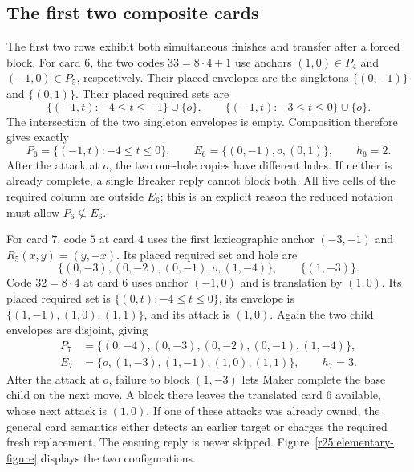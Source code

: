 \subsection{The first two composite cards}
\label{r25:elementary}

The first two rows exhibit both simultaneous finishes and transfer
after a forced block.  For card $6$, the two codes $33=8\cdot4+1$
use anchors $(1,0)\in P_4$ and $(-1,0)\in P_5$, respectively.
Their placed envelopes are the singletons $\{(0,-1)\}$ and
$\{(0,1)\}$.  Their placed required sets are
\[
 \{(-1,t):-4\leq t\leq-1\}\cup\{o\},\qquad
 \{(-1,t):-3\leq t\leq0\}\cup\{o\}.
\]
The intersection of the two singleton envelopes is empty.
Composition therefore gives exactly
\begin{equation}\label{r25:card6}
 P_6=\{(-1,t):-4\leq t\leq0\},\qquad
 E_6=\{(0,-1),o,(0,1)\},\qquad h_6=2.
\end{equation}
After the attack at $o$, the two one-hole copies have different
holes.  If neither is already complete, a single Breaker reply cannot
block both.  All five cells of the required column are outside $E_6$;
this is an explicit reason the reduced notation must allow
$P_6\not\subseteq E_6$.

For card $7$, code $5$ at card $4$ uses the first lexicographic anchor
$(-3,-1)$ and $R_5(x,y)=(y,-x)$.  Its placed required set and hole are
\[
 \{(0,-3),(0,-2),(0,-1),o,(1,-4)\},
 \qquad \{(1,-3)\}.
\]
Code $32=8\cdot4$ at card $6$ uses anchor $(-1,0)$ and is translation
by $(1,0)$.  Its placed required set is
$\{(0,t):-4\leq t\leq0\}$, its envelope is
$\{(1,-1),(1,0),(1,1)\}$, and its attack is $(1,0)$.
Again the two child envelopes are disjoint, giving
\begin{equation}\label{r25:card7}
 \begin{split}
 P_7&=\{(0,-4),(0,-3),(0,-2),(0,-1),(1,-4)\},\\
 E_7&=\{o,(1,-3),(1,-1),(1,0),(1,1)\},\qquad h_7=3.
 \end{split}
\end{equation}
After the attack at $o$, failure to block $(1,-3)$ lets Maker complete
the base child on the next move.  A block there leaves the translated
card $6$ available, whose next attack is $(1,0)$.  If one of these
attacks was already owned, the general card semantics either detects
an earlier target or charges the required fresh replacement.  The
ensuing reply is never skipped.  Figure~\ref{r25:elementary-figure}
displays the two configurations.

